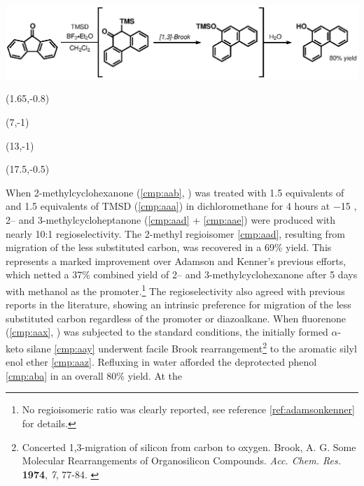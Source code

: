 \begin{Scheme}[b]
  \centering \includegraphics[scale=0.8]{chp_diazobkg/images/shioiritwo}
   \begin{textblock}{1}(1.65,-0.8)  \end{textblock}
  \begin{textblock}{1}(7,-1)  \end{textblock}
  \begin{textblock}{1}(13,-1)  \end{textblock}
  \begin{textblock}{1}(17.5,-0.5)  \end{textblock}
  \caption{Facile 1,3-Brook rearrangement of $\alpha$-keto silane intermediate \ref{cmp:aay}.}
  \label{sch:shioiritwo}
\end{Scheme}
When
2-methylcyclohexanone (\ref{cmp:aab}, ) was treated with 1.5 equivalents of
 and 1.5 equivalents of TMSD (\ref{cmp:aaa}) in dichloromethane for 4 hours at $-$15
\degc, 2-- and 3-methylcycloheptanone (\ce{->}\ref{cmp:aad} + \ref{cmp:aae}) were produced with nearly 10:1
regioselectivity.
The 2-methyl regioisomer \ref{cmp:aad}, resulting from migration of the less substituted carbon, was
recovered in a 69\% yield.
This represents a marked improvement over Adamson and Kenner's previous efforts, which netted a 37\%
combined yield of 2-- and 3-methylcyclohexanone after 5 days with methanol as the
promoter.\footnote{No regioisomeric ratio was clearly reported, see reference
\ref{ref:adamsonkenner} for details.} The regioselectivity also agreed with previous reports in the
literature, showing an intrinsic preference for migration of the less substituted carbon regardless
of the promoter or diazoalkane.
When fluorenone (\ref{cmp:aax}, ) was subjected to the standard conditions,
the initially formed $\alpha$-keto silane \ref{cmp:aay} underwent facile Brook
rearrangement\footnote{Concerted 1,3-migration of silicon from carbon to oxygen. {\frenchspacing
Brook, A.
G.
Some Molecular Rearrangements of Organosilicon Compounds. \textit{Acc. Chem. Res.} \textbf{1974},
\textit{7}, 77-84.} \label{ref:brook}} to the aromatic silyl enol ether \ref{cmp:aaz}.
Refluxing in water afforded the deprotected phenol \ref{cmp:aba} in an overall 80\% yield. At the
